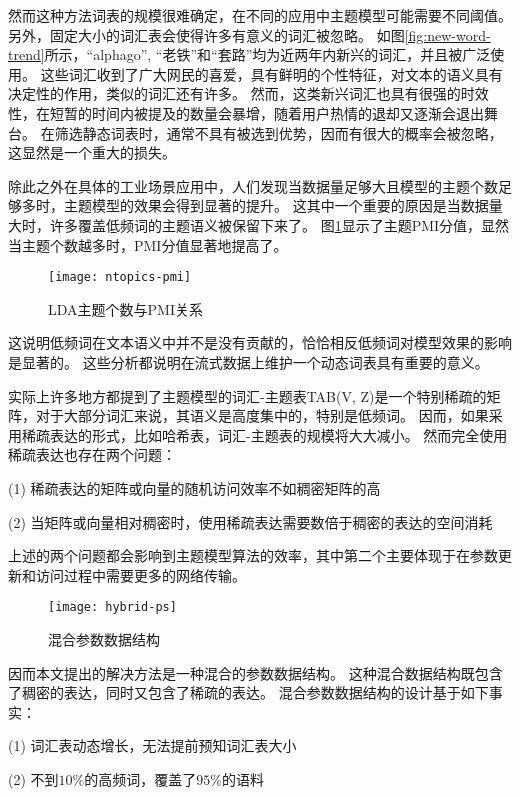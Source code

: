 然而这种方法词表的规模很难确定，在不同的应用中主题模型可能需要不同阈值。
另外，固定大小的词汇表会使得许多有意义的词汇被忽略。
如图\ref{fig:new-word-trend}所示，“alphago”, “老铁”和“套路”均为近两年内新兴的词汇，并且被广泛使用。
这些词汇收到了广大网民的喜爱，具有鲜明的个性特征，对文本的语义具有决定性的作用，类似的词汇还有许多。
然而，这类新兴词汇也具有很强的时效性，在短暂的时间内被提及的数量会暴增，随着用户热情的退却又逐渐会退出舞台。
在筛选静态词表时，通常不具有被选到优势，因而有很大的概率会被忽略，这显然是一个重大的损失。

除此之外在具体的工业场景应用中，人们发现当数据量足够大且模型的主题个数足够多时，主题模型的效果会得到显著的提升。
这其中一个重要的原因是当数据量大时，许多覆盖低频词的主题语义被保留下来了\cite{Peacock}。
图\ref{fig:ntopics-pmi}显示了主题PMI分值，显然当主题个数越多时，PMI分值显著地提高了。

\begin{figure}[htb]\centering
\texttt{[image: ntopics-pmi]}
\caption{LDA主题个数与PMI关系}
\label{fig:ntopics-pmi}       %
\end{figure}

这说明低频词在文本语义中并不是没有贡献的，恰恰相反低频词对模型效果的影响是显著的。
这些分析都说明在流式数据上维护一个动态词表具有重要的意义。

实际上许多地方都提到了主题模型的词汇-主题表TAB(V, Z)是一个特别稀疏的矩阵，对于大部分词汇来说，其语义是高度集中的，特别是低频词。
因而，如果采用稀疏表达的形式，比如哈希表，词汇-主题表的规模将大大减小。
然而完全使用稀疏表达也存在两个问题：

(1) 稀疏表达的矩阵或向量的随机访问效率不如稠密矩阵的高

(2) 当矩阵或向量相对稠密时，使用稀疏表达需要数倍于稠密的表达的空间消耗

上述的两个问题都会影响到主题模型算法的效率，其中第二个主要体现于在参数更新和访问过程中需要更多的网络传输。


\begin{figure}[htb]\centering
\texttt{[image: hybrid-ps]}
\caption{混合参数数据结构}
\label{fig:hybrid-ps}       %
\end{figure}

因而本文提出的解决方法是一种混合的参数数据结构。
这种混合数据结构既包含了稠密的表达，同时又包含了稀疏的表达。
混合参数数据结构的设计基于如下事实：

(1) 词汇表动态增长，无法提前预知词汇表大小

(2) 不到$10\%$的高频词，覆盖了$95\%$的语料

